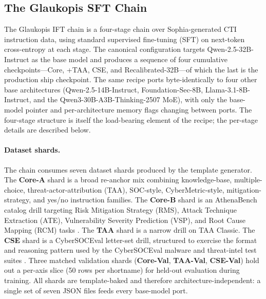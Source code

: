 \documentclass[conference]{IEEEtran}
\begin{document}
\subsection{The Glaukopis SFT Chain}
\label{sec:glaukopis-sft}

The Glaukopis IFT chain is a four-stage chain over Sophia-generated CTI instruction data, using standard supervised fine-tuning (SFT) on next-token cross-entropy at each stage. The canonical configuration targets Qwen-2.5-32B-Instruct as the base model and produces a sequence of four cumulative checkpoints---Core, +TAA, CSE, and Recalibrated-32B---of which the last is the production ship checkpoint. The same recipe ports byte-identically to four other base architectures (Qwen-2.5-14B-Instruct, Foundation-Sec-8B, Llama-3.1-8B-Instruct, and the Qwen3-30B-A3B-Thinking-2507 MoE), with only the base-model pointer and per-architecture memory flags changing between ports. The four-stage structure is itself the load-bearing element of the recipe; the per-stage details are described below.

\paragraph{Dataset shards.}
The chain consumes seven dataset shards produced by the template generator. The \textbf{Core-A} shard is a broad re-anchor mix combining knowledge-base, multiple-choice, threat-actor-attribution (TAA), SOC-style, CyberMetric-style, mitigation-strategy, and yes/no instruction families. The \textbf{Core-B} shard is an AthenaBench catalog drill targeting Risk Mitigation Strategy (RMS), Attack Technique Extraction (ATE), Vulnerability Severity Prediction (VSP), and Root Cause Mapping (RCM) tasks \cite{alam2025athenabench}. The \textbf{TAA} shard is a narrow drill on TAA Classic. The \textbf{CSE} shard is a CyberSOCEval letter-set drill, structured to exercise the format and reasoning pattern used by the CyberSOCEval malware and threat-intel test suites \cite{cybersoceval2025}. Three matched validation shards (\textbf{Core-Val}, \textbf{TAA-Val}, \textbf{CSE-Val}) hold out a per-axis slice (50 rows per shortname) for held-out evaluation during training. All shards are template-baked and therefore architecture-independent: a single set of seven JSON files feeds every base-model port.
\end{document}
